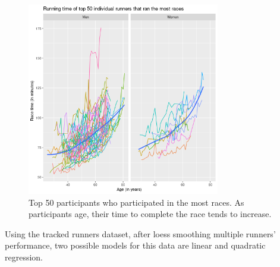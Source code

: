 \documentclass[12pt]{article}
\begin{document}

\begin{figure}[ht]
	\centering
	\includegraphics[width = 0.75\textwidth]
	{../figure/overview_tracked_runners-4.png}
	\caption{
		Top 50 participants who participated in the most races.
		As participants age, their time to complete the race
		tends to increase.
	}
	\label{tracked-runners-smooth}
\end{figure}


Using the tracked runners dataset, after loess smoothing multiple runners' performance, two possible models for this data are linear and quadratic regression.
\end{document}
